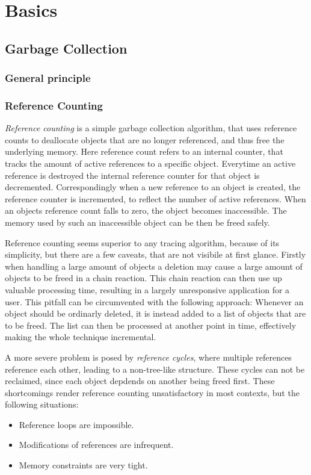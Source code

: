 \documentclass[twocolumn]{article}
\begin{document}
\section{Basics}
\subsection{Garbage Collection}
\subsubsection{General principle}
\subsubsection{Reference Counting}
\textit{Reference counting} is a simple garbage collection algorithm, that uses reference counts to deallocate objects that are no longer referenced, and thus free the underlying memory.
Here reference count refers to an internal counter, that tracks the amount of active references to a specific object.
Everytime an active reference is destroyed the internal reference counter for that object is decremented.
Correspondingly when a new reference to an object is created, the reference counter is incremented, to reflect the number of active references.
When an objects reference count falls to zero, the object becomes inaccessible.
The memory used by such an inaccessible object can be then be freed safely.

Reference counting seems superior to any tracing algorithm, because of its simplicity, but there are a few caveats, that are not visibile at first glance.
Firstly when handling a large amount of objects a deletion may cause a large amount of objects to be freed in a chain reaction.
This chain reaction can then use up valuable processing time, resulting in a largely unresponsive application for a user.
This pitfall can be circumvented with the following approach: Whenever an object should be ordinarly deleted, it is instead added to a list of objects that are to be freed.
The list can then be processed at another point in time, effectively making the whole technique incremental.

A more severe problem is posed by \textit{reference cycles}, where multiple references reference each other, leading to a non-tree-like structure.
These cycles can not be reclaimed, since each object depdends on another being freed first.
These shortcomings render reference counting unsatisfactory in most contexts, but the following situations:
\begin{itemize}
        \item Reference loops are impossible.
        \item Modifications of references are infrequent.
        \item Memory constraints are very tight.
\end{itemize}
\end{document}

